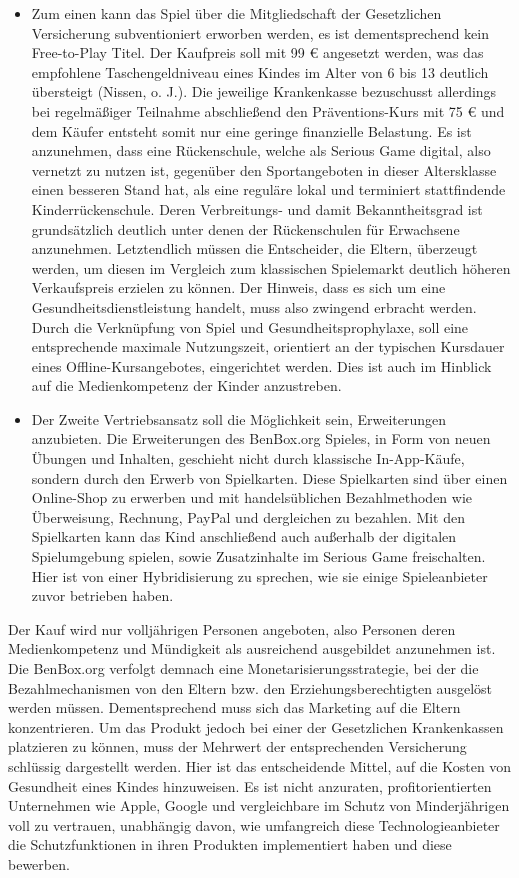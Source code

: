 \documentclass[
  a4paper,
  DIV=11,
  numbers=noendperiod,
  onecolumn,
  oneside,
  a4paper]{scrartcl}
\providecommand{\tightlist}{%
  \setlength{\itemsep}{0pt}\setlength{\parskip}{0pt}}
\begin{document}
\begin{itemize}
\tightlist
\item
  Zum einen kann das Spiel über die Mitgliedschaft der Gesetzlichen
  Versicherung subventioniert erworben werden, es ist dementsprechend
  kein Free-to-Play Titel. Der Kaufpreis soll mit 99 € angesetzt werden,
  was das empfohlene Taschengeldniveau eines Kindes im Alter von 6 bis
  13 deutlich übersteigt (Nissen, o. J.). Die jeweilige Krankenkasse
  bezuschusst allerdings bei regelmäßiger Teilnahme abschließend den
  Präventions-Kurs mit 75 € und dem Käufer entsteht somit nur eine
  geringe finanzielle Belastung. Es ist anzunehmen, dass eine
  Rückenschule, welche als Serious Game digital, also vernetzt zu nutzen
  ist, gegenüber den Sportangeboten in dieser Altersklasse einen
  besseren Stand hat, als eine reguläre lokal und terminiert
  stattfindende Kinderrückenschule. Deren Verbreitungs- und damit
  Bekanntheitsgrad ist grundsätzlich deutlich unter denen der
  Rückenschulen für Erwachsene anzunehmen. Letztendlich müssen die
  Entscheider, die Eltern, überzeugt werden, um diesen im Vergleich zum
  klassischen Spielemarkt deutlich höheren Verkaufspreis erzielen zu
  können. Der Hinweis, dass es sich um eine Gesundheitsdienstleistung
  handelt, muss also zwingend erbracht werden. Durch die Verknüpfung von
  Spiel und Gesundheitsprophylaxe, soll eine entsprechende maximale
  Nutzungszeit, orientiert an der typischen Kursdauer eines
  Offline-Kursangebotes, eingerichtet werden. Dies ist auch im Hinblick
  auf die Medienkompetenz der Kinder anzustreben.
\item
  Der Zweite Vertriebsansatz soll die Möglichkeit sein, Erweiterungen
  anzubieten. Die Erweiterungen des BenBox.org Spieles, in Form von
  neuen Übungen und Inhalten, geschieht nicht durch klassische
  In-App-Käufe, sondern durch den Erwerb von Spielkarten. Diese
  Spielkarten sind über einen Online-Shop zu erwerben und mit
  handelsüblichen Bezahlmethoden wie Überweisung, Rechnung, PayPal und
  dergleichen zu bezahlen. Mit den Spielkarten kann das Kind
  anschließend auch außerhalb der digitalen Spielumgebung spielen, sowie
  Zusatzinhalte im Serious Game freischalten. Hier ist von einer
  Hybridisierung zu sprechen, wie sie einige Spieleanbieter zuvor
  betrieben haben.
\end{itemize}

Der Kauf wird nur volljährigen Personen angeboten, also Personen deren
Medienkompetenz und Mündigkeit als ausreichend ausgebildet anzunehmen
ist. Die BenBox.org verfolgt demnach eine Monetarisierungsstrategie, bei
der die Bezahlmechanismen von den Eltern bzw. den Erziehungsberechtigten
ausgelöst werden müssen. Dementsprechend muss sich das Marketing auf die
Eltern konzentrieren. Um das Produkt jedoch bei einer der Gesetzlichen
Krankenkassen platzieren zu können, muss der Mehrwert der entsprechenden
Versicherung schlüssig dargestellt werden. Hier ist das entscheidende
Mittel, auf die Kosten von Gesundheit eines Kindes hinzuweisen. Es ist
nicht anzuraten, profitorientierten Unternehmen wie Apple, Google und
vergleichbare im Schutz von Minderjährigen voll zu vertrauen, unabhängig
davon, wie umfangreich diese Technologieanbieter die Schutzfunktionen in
ihren Produkten implementiert haben und diese bewerben.
\end{document}
